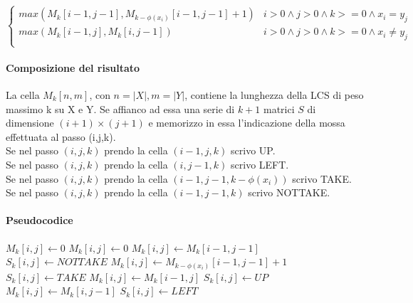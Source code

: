 \[
    \begin{cases}
        max (M_k[i-1,j-1] , M_{k-\phi(x_i)}[i-1,j-1] + 1) & i > 0 \land j > 0 \land k >= 0 \land x_i = y_j \\
        max (M_k[i-1,j] , M_k[i,j-1]) & i > 0 \land j > 0 \land k >= 0 \land x_i \neq y_j \\
    \end{cases}
\]

\paragraph{Composizione del risultato}

La cella $M_k[n, m]$, con $n = |X|, m = |Y|$, contiene la lunghezza della LCS di peso massimo k su X e Y.
Se affianco ad essa una serie di $k+1$ matrici $S$ di dimensione $(i+1) \times (j+1)$ e memorizzo in essa l'indicazione della mossa effettuata al passo (i,j,k). \\
Se nel passo $(i,j,k)$ prendo la cella $(i-1,j,k)$ scrivo UP. \\
Se nel passo $(i,j,k)$ prendo la cella $(i,j-1,k)$ scrivo LEFT. \\
Se nel passo $(i,j,k)$ prendo la cella $(i-1,j-1,k-\phi(x_i))$ scrivo TAKE. \\
Se nel passo $(i,j,k)$ prendo la cella $(i-1,j-1,k)$ scrivo NOTTAKE. \\

\newpage
\paragraph{Pseudocodice}

\begin{algorithm}
    \begin{algorithmic}
                            \State $M_k[i,j] \gets 0$
                            \State $M_k[i,j] \gets 0$
                                \State $M_k[i,j] \gets M_k[i-1,j-1]$
                                \State $S_k[i,j] \gets NOTTAKE$
                            \Else
                                \State $M_k[i,j] \gets M_{k-\phi(x_i)}[i-1,j-1] + 1$
                                \State $S_k[i,j] \gets TAKE$
                            \EndIf
                                \State $M_k[i,j] \gets M_k[i-1,j]$
                                \State $S_k[i,j] \gets UP$
                            \Else
                                \State $M_k[i,j] \gets M_k[i,j-1]$
                                \State $S_k[i,j] \gets LEFT$
                            \EndIf
                        \EndIf
                    \EndFor
                \EndFor
            \EndFor
        \EndProcedure
    \end{algorithmic}
\end{algorithm}

